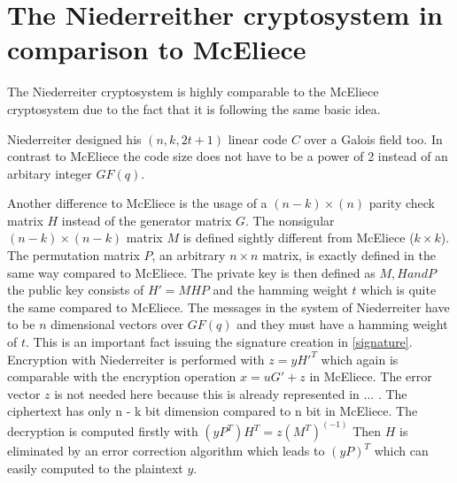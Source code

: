 
\section{The Niederreither cryptosystem in comparison to McEliece}
\label{niederreither}
The Niederreiter cryptosystem is highly comparable to the McEliece cryptosystem due to the fact that it is following the same basic idea. 

Niederreiter designed his $(n, k, 2t + 1)$ linear code $C$ over a Galois field too. In contrast to McEliece the code size does not have to be a power of 2 instead of an arbitary integer $GF(q)$. 

Another difference to McEliece is the usage of a $(n - k) \times (n)$ parity check matrix $H$ instead of  the generator matrix $G$. %
The nonsigular $(n - k) \times (n - k)$ matrix $M$ is defined sightly different from McEliece ($k \times k$).%
The permutation matrix $P$, an arbitrary $n \times n$ matrix, is exactly defined in the same way compared to McEliece.
The private key is then defined as $M, H and P$ the public key consists of $H' = MHP$ and the hamming weight $t$ which is quite the same compared to McEliece.
The messages in the system of Niederreiter have to be $n$ dimensional vectors over $GF(q)$ and they must have a hamming weight of $t$. This is an important fact issuing the signature creation in \autoref{signature}.
Encryption with Niederreiter is performed with $z = yH'^T$ which again is comparable with the encryption operation $x = uG' + z$ in McEliece. The error vector $z$ is not needed here because this is already represented in ... . The ciphertext has only n - k bit dimension compared to n bit in McEliece. 
The decryption is computed firstly with $(yP^T)H^T = z(M^T)^(-1)$ Then $H$ is eliminated by an error correction algorithm which leads to $(yP)^T$ which can easily computed to the plaintext $y$. \cite{sendrier2011niederreiter}\cite{li1994equivalence}\cite{niederreiter1986knapsack}








